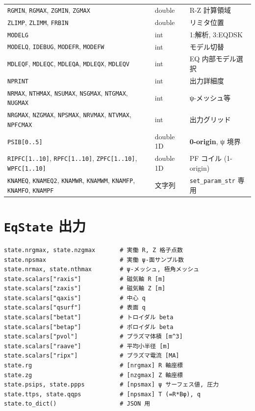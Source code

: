\documentclass[11pt,a4paper]{report}
\begin{document}
\begin{longtable}{@{}p{3.3cm}p{2.2cm}p{9cm}@{}}
\texttt{RGMIN}, \texttt{RGMAX}, \texttt{ZGMIN}, \texttt{ZGMAX} & double & R-Z 計算領域 \\
\texttt{ZLIMP}, \texttt{ZLIMM}, \texttt{FRBIN} & double & リミタ位置 \\
\texttt{MODELG}                              & int   & 1:解析, 3:EQDSK \\
\texttt{MODELQ}, \texttt{IDEBUG}, \texttt{MODEFR}, \texttt{MODEFW} & int & モデル切替 \\
\texttt{MDLEQF}, \texttt{MDLEQC}, \texttt{MDLEQA}, \texttt{MDLEQX}, \texttt{MDLEQV} & int & EQ 内部モデル選択 \\
\texttt{NPRINT}                              & int   & 出力詳細度 \\
\texttt{NRMAX}, \texttt{NTHMAX}, \texttt{NSUMAX}, \texttt{NSGMAX}, \texttt{NTGMAX}, \texttt{NUGMAX} & int & ψ-メッシュ等 \\
\texttt{NRGMAX}, \texttt{NZGMAX}, \texttt{NPSMAX}, \texttt{NRVMAX}, \texttt{NTVMAX}, \texttt{NPFCMAX} & int & 出力グリッド \\
\texttt{PSIB[0..5]}                          & double 1D & \textbf{0-origin}, ψ 境界 \\
\texttt{RIPFC[1..10]}, \texttt{RPFC[1..10]}, \texttt{ZPFC[1..10]}, \texttt{WPFC[1..10]} & double 1D & PF コイル (1-origin) \\
\texttt{KNAMEQ}, \texttt{KNAMEQ2}, \texttt{KNAMWR}, \texttt{KNAMWM}, \texttt{KNAMFP}, \texttt{KNAMFO}, \texttt{KNAMPF} & 文字列 & \texttt{set\_param\_str} 専用 \\
\bottomrule
\end{longtable}

\section{\texttt{EqState} 出力}

\begin{lstlisting}[style=py]
state.nrgmax, state.nzgmax       # 実働 R, Z 格子点数
state.npsmax                     # 実働 ψ-面サンプル数
state.nrmax, state.nthmax        # ψ-メッシュ, 極角メッシュ
state.scalars["raxis"]           # 磁気軸 R [m]
state.scalars["zaxis"]           # 磁気軸 Z [m]
state.scalars["qaxis"]           # 中心 q
state.scalars["qsurf"]           # 表面 q
state.scalars["betat"]           # トロイダル beta
state.scalars["betap"]           # ポロイダル beta
state.scalars["pvol"]            # プラズマ体積 [m^3]
state.scalars["raave"]           # 平均小半径 [m]
state.scalars["ripx"]            # プラズマ電流 [MA]
state.rg                         # [nrgmax] R 軸座標
state.zg                         # [nzgmax] Z 軸座標
state.psips, state.ppps          # [npsmax] ψ サーフェス値, 圧力
state.ttps, state.qqps           # [npsmax] T (=R*Bφ), q
state.to_dict()                  # JSON 用
\end{lstlisting}
\end{document}
